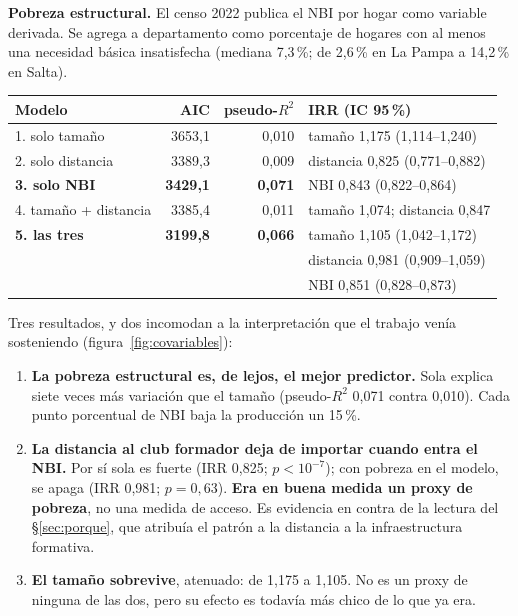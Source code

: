 \documentclass[11pt,a4paper]{article}
\begin{document}
\textbf{Pobreza estructural.} El censo 2022 publica el NBI por hogar como
variable derivada. Se agrega a departamento como porcentaje de hogares con al
menos una necesidad básica insatisfecha (mediana 7,3\,\%; de 2,6\,\% en La Pampa
a 14,2\,\% en Salta).

\begin{center}\small
\begin{tabular}{@{}lrrl@{}}
\toprule
\textbf{Modelo} & \textbf{AIC} & \textbf{pseudo-$R^2$} & \textbf{IRR (IC 95\,\%)}\\
\midrule
1. solo tamaño & 3653,1 & 0,010 & tamaño 1,175 (1,114--1,240)\\
2. solo distancia & 3389,3 & 0,009 & distancia 0,825 (0,771--0,882)\\
\textbf{3. solo NBI} & \textbf{3429,1} & \textbf{0,071} & NBI 0,843 (0,822--0,864)\\
4. tamaño + distancia & 3385,4 & 0,011 & tamaño 1,074; distancia 0,847\\
\textbf{5. las tres} & \textbf{3199,8} & \textbf{0,066} &
  tamaño 1,105 (1,042--1,172)\\
 & & & distancia 0,981 (0,909--1,059)\\
 & & & NBI 0,851 (0,828--0,873)\\
\bottomrule
\end{tabular}
\end{center}

Tres resultados, y dos incomodan a la interpretación que el trabajo venía
sosteniendo (figura~\ref{fig:covariables}):

\begin{enumerate}[leftmargin=1.6em,itemsep=0.25em]
  \item \textbf{La pobreza estructural es, de lejos, el mejor predictor.} Sola
    explica siete veces más variación que el tamaño (pseudo-$R^2$ 0,071 contra
    0,010). Cada punto porcentual de NBI baja la producción un 15\,\%.
  \item \textbf{La distancia al club formador deja de importar cuando entra el
    NBI.} Por sí sola es fuerte (IRR 0,825; $p < 10^{-7}$); con pobreza en el
    modelo, se apaga (IRR 0,981; $p = 0{,}63$). \textbf{Era en buena medida un
    proxy de pobreza}, no una medida de acceso. Es evidencia en contra de la
    lectura del §\ref{sec:porque}, que atribuía el patrón a la distancia a la
    infraestructura formativa.
  \item \textbf{El tamaño sobrevive}, atenuado: de 1,175 a 1,105. No es un proxy
    de ninguna de las dos, pero su efecto es todavía más chico de lo que ya era.
\end{enumerate}
\end{document}

